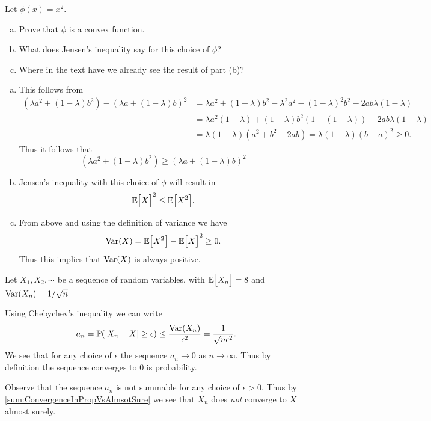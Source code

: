 \begin{problem}
	Let $ \phi(x) = x^2 $.
	\begin{enumerate}[(a)]
		\item Prove that $ \phi $ is a convex function.
		\item What does Jensen's inequality say for this choice of $ \phi $?
		\item Where in the text have we already see the result of part (b)?
	\end{enumerate}
\end{problem}
\begin{solution}
	\begin{enumerate}[(a)]
		\item This follows from 
		\begin{align*}
			\left(\lambda a^2 + (1-\lambda)b^2\right) - \left(\lambda a + (1-\lambda)b\right)^2 &= \lambda a^2 + (1-\lambda)b^2 - \lambda^2a^2 - (1-\lambda)^2b^2 - 2ab\lambda(1-\lambda)\\
			&= \lambda a^2 (1-\lambda) + (1-\lambda)b^2 (1-(1-\lambda)) - 2ab\lambda(1-\lambda) \\
			&= \lambda(1-\lambda)(a^2+b^2 - 2ab) = \lambda(1-\lambda)(b-a)^2 \geq 0.
		\end{align*}
		Thus it follows that
		$$
		\left(\lambda a^2 + (1-\lambda)b^2\right) \geq \left(\lambda a + (1-\lambda)b\right)^2
		$$
		
		\item Jensen's inequality with this choice of $ \phi $ will result in 
		\[ \mathbb{E}\big[X\big]^2 \leq \mathbb{E}\big[X^2\big]. \]
		
		\item From above and using the definition of variance we have
		\[ \operatorname{Var}(X) = \mathbb{E}\big[X^2\big] - \mathbb{E}\big[X\big]^2 \geq 0. \]
		Thus this implies that $ \operatorname{Var}(X) $ is always positive.

	\end{enumerate}
\end{solution}

\begin{problem}
	Let $ X_1,X_2,\cdots $ be a sequence of random variables, with $ \mathbb{E}\big[X_n\big] = 8 $ and $ \operatorname{Var}(X_n) = 1/\sqrt{n} $
\end{problem}
\begin{solution}
	Using Chebychev's inequality we can write
	\[ a_n = \mathbb{P}(|X_n - X|\geq \epsilon) \leq \frac{\operatorname{Var}(X_n)}{\epsilon^2} = \frac{1}{\sqrt{n}\epsilon^2}.  \]
	We see that for any choice of $ \epsilon $ the sequence $ a_n \to 0 $ as $ n\to\infty $. Thus by definition the sequence converges to $ 0 $ is probability.
\end{solution}
\begin{remark}
	Observe that the sequence $ a_n $ is not summable for any choice of $ \epsilon>0 $. Thus by \autoref{sum:ConvergenceInPropVsAlmsotSure} we see that $ X_n $ does \emph{not} converge to $ X $ almost surely.
\end{remark}

